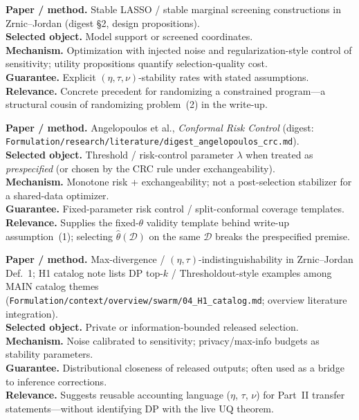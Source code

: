 \documentclass[11pt]{article}
\begin{document}
\begin{tcolorbox}[entrybox, title=Regularization / constrained randomized optimization]
\textbf{Paper / method.} Stable LASSO / stable marginal screening constructions in
Zrnic--Jordan (digest §2, design propositions).\\
\textbf{Selected object.} Model support or screened coordinates.\\
\textbf{Mechanism.} Optimization with injected noise and regularization-style control of
sensitivity; utility propositions quantify selection-quality cost.\\
\textbf{Guarantee.} Explicit $(\eta,\tau,\nu)$-stability rates with stated assumptions.\\
\textbf{Relevance.} Concrete precedent for randomizing a constrained program---a
structural cousin of randomizing problem~(2) in the write-up.
\end{tcolorbox}

\begin{tcolorbox}[entrybox, title=Conformal risk control (fixed hyperparameter)]
\textbf{Paper / method.} Angelopoulos et al., \emph{Conformal Risk Control}
(digest: \texttt{Formulation/research/literature/digest\_angelopoulos\_crc.md}).\\
\textbf{Selected object.} Threshold / risk-control parameter $\lambda$ when treated as
\emph{prespecified} (or chosen by the CRC rule under exchangeability).\\
\textbf{Mechanism.} Monotone risk + exchangeability; not a post-selection stabilizer
for a shared-data optimizer.\\
\textbf{Guarantee.} Fixed-parameter risk control / split-conformal coverage templates.\\
\textbf{Relevance.} Supplies the fixed-$\theta$ validity template behind write-up
assumption~(1); selecting $\hat\theta(\mathcal{D})$ on the same $\mathcal{D}$ breaks the
prespecified premise.
\end{tcolorbox}

\begin{tcolorbox}[entrybox, title=Differential privacy / max-information style control]
\textbf{Paper / method.} Max-divergence / $(\eta,\tau)$-indistinguishability in
Zrnic--Jordan Def.~1; H1 catalog note lists DP top-$k$ / Thresholdout-style examples among
MAIN catalog themes
(\texttt{Formulation/context/overview/swarm/04\_H1\_catalog.md};
overview literature integration).\\
\textbf{Selected object.} Private or information-bounded released selection.\\
\textbf{Mechanism.} Noise calibrated to sensitivity; privacy/max-info budgets as
stability parameters.\\
\textbf{Guarantee.} Distributional closeness of released outputs; often used as a bridge
to inference corrections.\\
\textbf{Relevance.} Suggests reusable accounting language ($\eta$, $\tau$, $\nu$) for
Part~II transfer statements---without identifying DP with the live UQ theorem.
\end{tcolorbox}
\end{document}
